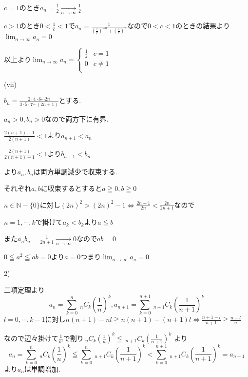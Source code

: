 \documentclass{jsarticle}
\begin{document}
       $c=1$のとき$a_n=\frac{1}{2}\xrightarrow[n\to\infty]{}\frac{1}{2}$
       
       $c>1$のとき$0<\frac{1}{c}<1$で$a_n=\frac{1}{(\frac{1}{c})^{-n}+(\frac{1}{c})^{n}}$なので$0<c<1$のときの結果より$\displaystyle \lim_{n\to \infty}a_n=0$
       
       以上より$\displaystyle \lim_{n\to \infty}a_n=\begin{cases}
       \frac{1}{2} & c=1\\
       0 & c\neq 1\\
       \end{cases}$
       
       (vii)
       
       $b_n=\frac{2\cdot4\cdot 6\cdots 2n}{3\cdot5\cdot 7\cdots (2n+1)}$とする.
       
       $a_n>0,b_n>0$なので両方下に有界.
       
       $\frac{2(n+1)-1}{2(n+1)}<1$より$a_{n+1}<a_n$
       
              $\frac{2(n+1)}{2(n+1)+1}<1$より$b_{n+1}<b_n$
              
              より$a_n,b_n$は両方単調減少で収束する.
              
              それぞれ$a,b$に収束するとすると$a\geqq0,b\geqq 0$
              
             $n\in\mathbb{N}-\{0\}$に対し$(2n)^2>(2n)^2-1\Leftrightarrow \frac{2n-1}{2n}<\frac{2n}{2n+1}$なので
             
             $n=1,\cdots ,k$で掛けて$a_k<b_k$より$a\leqq b$
             
             また$a_nb_n = \frac{1}{2n+1}\xrightarrow[n\to\infty]{}0$なので$ab=0$
             
             $0\leqq a^2\leqq ab = 0$より$a=0$つまり$\displaystyle \lim_{n\to\infty}a_n=0$
       
       2)
       
       二項定理より
       \[a_n=\sum_{k=0}^n \ _nC_k (\frac{1}{n})^k,a_{n+1}=\sum_{k=0}^{n+1} \ _{n+1}C_k (\frac{1}{n+1})^k\]
      $l=0,\cdots ,k-1$に対し$n(n+1)-nl\geqq n(n+1)-(n+1)l\Leftrightarrow \frac{n+1-l}{n+1}\geqq \frac{n-l}{n}$
      
      なので辺々掛けて$\frac{1}{k!}$で割り$ \ _nC_k (\frac{1}{n})^k \leqq \ _{n+1}C_k (\frac{1}{n+1})^k$
      より
              \[a_n=\sum_{k=0}^n \ _nC_k (\frac{1}{n})^k\leqq \sum_{k=0}^{n} \ _{n+1}C_k (\frac{1}{n+1})^k < \sum_{k=0}^{n+1} \ _{n+1}C_k (\frac{1}{n+1})^k=a_{n+1}\]
              より$a_n$は単調増加.
              
\end{document}
